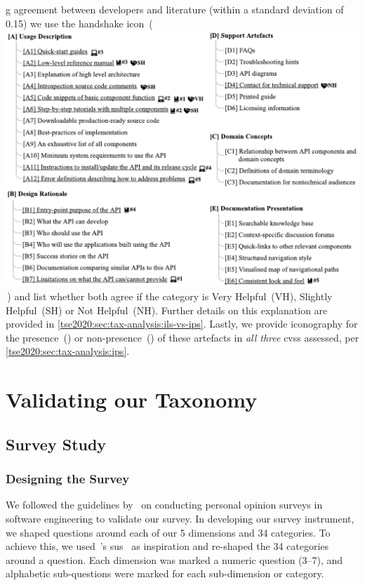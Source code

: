 g agreement between developers and literature (within a standard deviation of 0.15) we use the handshake icon~(\,\includegraphics{handshake}\,) and list whether both agree if the category is Very Helpful~(VH), Slightly Helpful~(SH) or Not Helpful~(NH). Further details on this explanation are provided in \cref{tse2020:sec:tax-analysis:ils-vs-ips}. Lastly, we provide iconography for the presence~(\faCheckCircle) or non-presence~(\faTimesCircle) of these   artefacts in \textit{all three} \glspl{cvs} assessed, per \cref{tse2020:sec:tax-analysis:ips}.


\section{Validating our Taxonomy}
\label{tse2020:sec:validation}

\subsection{Survey Study}
\label{tse2020:sec:validation:survey}

\subsubsection{Designing the Survey}

We followed the guidelines by~\citet{Kitchenham:2007ux} on conducting personal opinion surveys in software engineering to validate our survey. In developing our survey instrument, we  shaped questions around each of our 5 dimensions and 34 categories. To achieve this, we used~\citeauthor{Brooke:1996ua}'s \gls{sus}~\citep{Brooke:1996ua} as inspiration and re-shaped the 34 categories around a question. Each dimension was marked a numeric question (3--7), and alphabetic sub-questions were marked for each sub-dimension or category.

